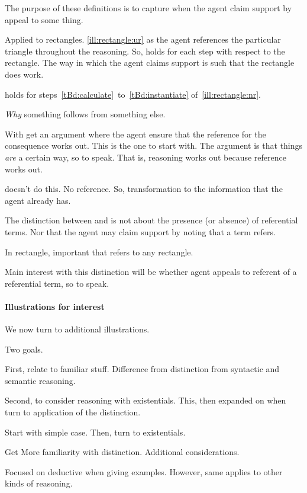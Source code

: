 \begin{note}
  The purpose of these definitions is to capture when the agent claim support by appeal to some thing.

  Applied to rectangles.
  \autoref{ill:rectangle:ur} as the agent references the particular triangle throughout the reasoning.
  So, \ur{} holds for each step with respect to the rectangle.
  The way in which the agent claims support is such that the rectangle does work.


  \nr{} holds for steps~\ref{tBd:calculate}~to~\ref{tBd:instantiate} of~\autoref{ill:rectangle:nr}.


  \emph{Why} something follows from something else.

  With \ur{} get an argument where the agent ensure that the reference for the consequence works out.
  This is the one to start with.
  The argument is that things \emph{are} a certain way, so to speak.
  That is, reasoning works out because reference works out.


  \nr{} doesn't do this.
  No reference.
  So, transformation to the information that the agent already has.
\end{note}

\begin{note}
  The distinction between \ur{} and \nr{} is not about the presence (or absence) of referential terms.
  Nor that the agent may claim support by noting that a term refers.

  In rectangle, important that refers to any rectangle.

  Main interest with this distinction will be whether agent appeals to referent of a referential term, so to speak.
\end{note}

\paragraph*{Illustrations for interest}

\begin{note}
  We now turn to additional illustrations.

  Two goals.

  First, relate to familiar stuff.
  Difference from distinction from syntactic and semantic reasoning.

  Second, to consider reasoning with existentials.
  This, then expanded on when turn to application of the distinction.

  Start with simple case.
  Then, turn to existentials.

  Get
  More familiarity with distinction.
  Additional considerations.

  Focused on deductive when giving examples.
  However, same applies to other kinds of reasoning.
\end{note}

